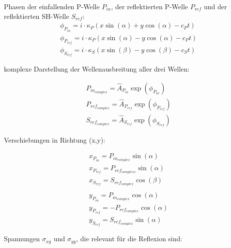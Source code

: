 \begin{solution}
    Phasen der einfallenden P-Welle $P_{in}$, der reflektierten P-Welle $P_{ref}$ und der reflektierten SH-Welle $S_{ref}$:
    \begin{align*}
            &\phi_{P_{in}} = \textit{i} \cdot \kappa_P (x \sin(\alpha) + y \cos(\alpha) - c_P t) \\
            &\phi_{P_{ref}} = \textit{i} \cdot \kappa_P (x \sin(\alpha) - y \cos(\alpha) - c_P t) \\
            &\phi_{S_{ref}} = \textit{i} \cdot \kappa_S (x \sin(\beta) - y \cos(\beta) - c_S t)
    \end{align*}

    komplexe Darstellung der Wellenausbreitung aller drei Wellen:

    \begin{align*}
        &P_{in_{complex}} = \hat{A}_{P_{in}} \exp(\phi_{P_{in}}) \\
        &P_{ref_{complex}} = \hat{A}_{P_{ref}} \exp(\phi_{P_{ref}}) \\
        &S_{ref_{complex}} = \hat{A}_{S_{ref}} \exp(\phi_{S_{ref}})
    \end{align*}

    Verschiebungen in Richtung (x,y):

    \begin{align*}
        &x_{P_{in}} = P_{in_{complex}} \sin(\alpha) \\
        &x_{P_{ref}} = P_{ref_{complexx}} \sin(\alpha) \\
        &x_{S_{ref}} = S_{ref_{complex}} \cos(\beta) \\
        \\
        &y_{P_{in}} = P_{in_{complex}} \cos(\alpha) \\
        &y_{P_{ref}} = - P_{ref_{complex}} \cos(\alpha) \\
        &y_{S_{ref}} = S_{ref_{complex}} \sin(\alpha)
    \end{align*}

    Spannungen $ \sigma_{xy}$ und $\sigma_{yy}$, die relevant für die Reflexion sind:


\end{solution}
